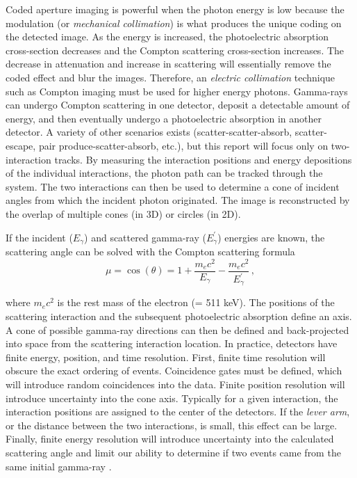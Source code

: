 \documentclass[10pt]{article}
\begin{document}
Coded aperture imaging is powerful when the photon energy is low because the modulation (or \emph{mechanical collimation}) is what produces the unique coding on the detected image. As the energy is increased, the photoelectric absorption cross-section decreases and the Compton scattering cross-section increases. The decrease in attenuation and increase in scattering will essentially remove the coded effect and blur the images. Therefore, an \emph{electric collimation} technique such as Compton imaging must be used for higher energy photons. Gamma-rays can undergo Compton scattering in one detector, deposit a detectable amount of energy, and then eventually undergo a photoelectric absorption in another detector. A variety of other scenarios exists (scatter-scatter-absorb, scatter-escape, pair produce-scatter-absorb, etc.), but this report will focus only on two-interaction tracks. By measuring the interaction positions and energy depositions of the individual interactions, the photon path can be tracked through the system. The two interactions can then be used to determine a cone of incident angles from which the incident photon originated. The image is reconstructed by the overlap of multiple cones (in 3D) or circles (in 2D).

If the incident ($E_\gamma$) and scattered gamma-ray ($E_\gamma^\prime$) energies are known, the scattering angle can be solved with the Compton scattering formula
%
\begin{equation}
\mu = \cos(\theta) = 1 + \frac{m_e c^2}{E_\gamma} - \frac{m_e c^2}{E_\gamma^\prime}\,,
\end{equation}

\noindent where $m_e c^2$ is the rest mass of the electron (= 511 keV). The positions of the scattering interaction and the subsequent photoelectric absorption define an axis. A cone of possible gamma-ray directions can then be defined and back-projected into space from the scattering interaction location. In practice, detectors have finite energy, position, and time resolution. First, finite time resolution will obscure the exact ordering of events. Coincidence gates must be defined, which will introduce random coincidences into the data. Finite position resolution will introduce uncertainty into the cone axis. Typically for a given interaction, the interaction positions are assigned to the center of the detectors. If the \emph{lever arm}, or the distance between the two interactions, is small, this effect can be large. Finally, finite energy resolution will introduce uncertainty into the calculated scattering angle and limit our ability to determine if two events came from the same initial gamma-ray \cite{Lehner2004}.
\end{document}
